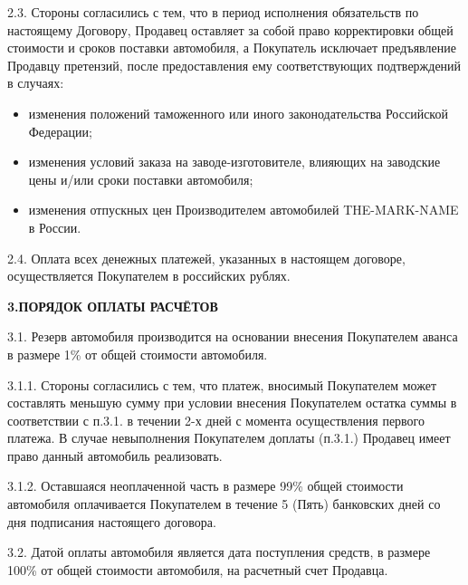 \documentclass[a4paper,12pt]{article}
\begin{document}
\begin{description}\item2.3. Стороны согласились с тем, что в период исполнения обязательств по настоящему Договору,  Продавец оставляет за собой право корректировки общей стоимости  и сроков поставки автомобиля, а Покупатель исключает  предъявление Продавцу претензий, после предоставления ему соответствующих подтверждений в случаях:\end{description}
 \begin{itemize}\item изменения положений таможенного или иного законодательства Российской Федерации;\end{itemize}
 \begin{itemize}\item изменения условий заказа на заводе-изготовителе, влияющих на заводские цены и/или сроки поставки автомобиля;\end{itemize}
 \begin{itemize}\item изменения отпускных цен Производителем автомобилей THE-MARK-NAME в России.\end{itemize}
   
\begin{description}\item2.4. Оплата всех денежных платежей, указанных в настоящем договоре, осуществляется Покупателем в российских рублях.\end{description}


\newpage
\begin{center}
 \vspace{1 ex}
 \textbf{3.ПОРЯДОК ОПЛАТЫ РАСЧЁТОВ}
 \vspace{1ex}
    \end{center}
\begin{description}\item
3.1. Резерв автомобиля производится на основании внесения Покупателем аванса в размере 1\% от общей стоимости автомобиля.\end{description}
\begin{description}\item3.1.1. Стороны согласились с тем, что платеж, вносимый Покупателем может составлять меньшую сумму при условии внесения Покупателем остатка суммы в соответствии с п.3.1. в течении 2-х дней с момента осуществления первого платежа. В случае невыполнения Покупателем доплаты (п.3.1.) Продавец имеет право данный автомобиль реализовать.\end{description}
\begin{description}\item3.1.2. Оставшаяся неоплаченной часть в размере 99\% общей стоимости автомобиля оплачивается Покупателем в течение  5 (Пять) банковских дней со дня подписания настоящего договора. \end{description}
\begin{description}\item3.2. Датой оплаты автомобиля является дата поступления средств, в размере 100\% от общей стоимости автомобиля, на расчетный счет Продавца.
\end{description}
 
\end{document}

